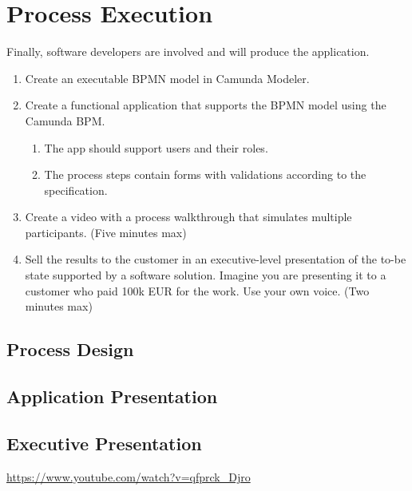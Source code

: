 \chapter{Process Execution}
Finally, software developers are involved and will produce the application. 

\begin{enumerate}
    \item Create an executable BPMN model in Camunda Modeler. 
    \item Create a functional application that supports the BPMN model using the Camunda BPM.
    \begin{enumerate}
        \item The app should support users and their roles. 
        \item The process steps contain forms with validations according to the specification. 
    \end{enumerate}
    \item Create a video with a process walkthrough that simulates multiple participants. (Five minutes max) 
    \item Sell the results to the customer in an executive-level presentation of the to-be state supported by a software solution. Imagine you are presenting it to a customer who paid 100k EUR for the work. Use your own voice. (Two minutes max) 
\end{enumerate}

\section{Process Design}

\section{Application Presentation}

\section{Executive Presentation}
\url{https://www.youtube.com/watch?v=qfprck_Djro} 
